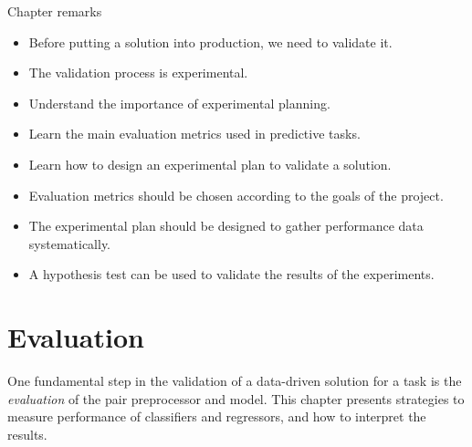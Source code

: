\begin{mainbox}{Chapter remarks}


  \startcontents[chapters]
  \vspace{1em}


  \begin{itemize}
    \itemsep0em
    \item Before putting a solution into production, we need to validate it.
    \item The validation process is experimental.
  \end{itemize}


  \begin{itemize}
    \itemsep0em
    \item Understand the importance of experimental planning.
    \item Learn the main evaluation metrics used in predictive tasks.
    \item Learn how to design an experimental plan to validate a solution.
  \end{itemize}


  \begin{itemize}
    \itemsep0em
    \item Evaluation metrics should be chosen according to the goals of the project.
    \item The experimental plan should be designed to gather performance data
      systematically.
    \item A hypothesis test can be used to validate the results of the experiments.
  \end{itemize}
\end{mainbox}

{}
\clearpage

\section{Evaluation}
\label{sec:evaluation}

One fundamental step in the validation of a data-driven solution for a task is the
\emph{evaluation} of the pair preprocessor and model. This chapter presents strategies to
measure performance of
classifiers and regressors, and how to interpret the results.

